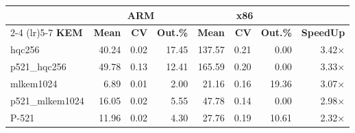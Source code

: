 \begin{table}[!ht]
\begin{tabular}{lrrr|rrr|r}
 \toprule
& \multicolumn{3}{c}{\bfseries ARM} & \multicolumn{3}{c}{\bfseries x86} &\\
\cmidrule(lr){2-4} \cmidrule(lr){5-7}
\textbf{KEM} & \textbf{Mean} & \textbf{CV} & \textbf{Out.\%} & \textbf{Mean} & \textbf{CV} & \textbf{Out.\%} & \textbf{SpeedUp}\\
\midrule
hqc256 & 40.24 & 0.02 & 17.45 & 137.57 & 0.21 & 0.00 & 3.42× \\
p521_hqc256 & 49.78 & 0.13 & 12.41 & 165.59 & 0.20 & 0.00 & 3.33× \\
mlkem1024 & 6.89 & 0.01 & 2.00 & 21.16 & 0.16 & 19.36 & 3.07× \\
p521_mlkem1024 & 16.05 & 0.02 & 5.55 & 47.78 & 0.14 & 0.00 & 2.98× \\
P-521 & 11.96 & 0.02 & 4.30 & 27.76 & 0.19 & 10.61 & 2.32× \\
\bottomrule
\end{tabular}
\end{table}
